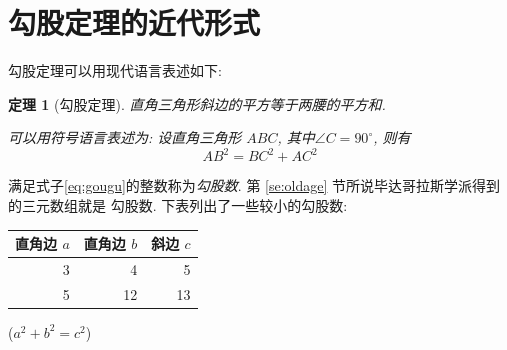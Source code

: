 \documentclass[nofonts]{ctexart}
\newtheorem{thm}{定理}
\begin{document}
\section{勾股定理的近代形式}
勾股定理可以用现代语言表述如下:
\begin{thm}[勾股定理]
直角三角形斜边的平方等于两腰的平方和.

可以用符号语言表述为: 设直角三角形 $ABC$, 其中$\angle C = 90^\circ$, 则有
\begin{equation}
	AB^2 = BC^2 + AC^2
	\label{eq:gougu}
\end{equation}
\end{thm}
满足式子\eqref{eq:gougu}的整数称为\emph{勾股数}. 第 \ref{se:oldage}
节所说毕达哥拉斯学派得到的三元数组就是
勾股数. 下表列出了一些较小的勾股数:
\begin{table}[H]
\begin{tabular}{|rrr|}
	\hline
	直角边	$a$ & 直角边 $b$ & 斜边 $c$ \\
	\hline
	3	    &	4  	 & 5	    \\
	5	    &   12       & 13       \\
	\hline
\end{tabular}%
\qquad
($a^2+b^2=c^2$)
\end{table}

\nocite{Shiye}

\end{document}
